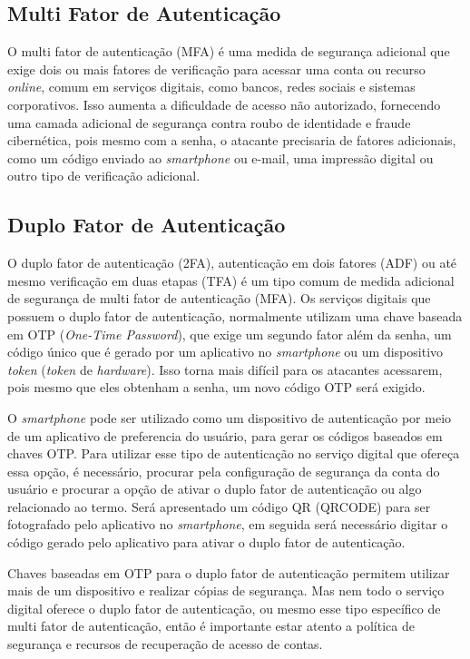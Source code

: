 \documentclass[12pt]{article}
\begin{document}
\subsection{Multi Fator de Autenticação}

O multi fator de autenticação (MFA) é uma medida de segurança adicional que
exige dois ou mais fatores de verificação para acessar uma conta ou
recurso \textit{online}, comum em serviços digitais, como bancos, redes sociais e
sistemas corporativos.
Isso aumenta a dificuldade de acesso não autorizado, fornecendo uma camada
adicional de segurança contra roubo de identidade e fraude cibernética, pois
mesmo com a senha, o atacante precisaria de fatores adicionais, como um código
enviado ao \textit{smartphone} ou e-mail, uma impressão digital ou outro tipo de
verificação adicional.

\subsection{Duplo Fator de Autenticação}

O duplo fator de autenticação (2FA), autenticação em dois fatores (ADF) ou
até mesmo verificação em duas etapas (TFA) é um tipo comum de medida adicional
de segurança de multi fator de autenticação (MFA).
Os serviços digitais que possuem o duplo fator de autenticação, normalmente
utilizam uma chave baseada em OTP (\textit{One-Time Password}), que exige um segundo fator
além da senha, um código único que é gerado por um aplicativo no \textit{smartphone} ou um
dispositivo \textit{token} (\textit{token} de \textit{hardware}).
Isso torna mais difícil para os atacantes acessarem, pois mesmo que eles
obtenham a senha, um novo código OTP será exigido.

O \textit{smartphone} pode ser utilizado como um dispositivo de autenticação por meio de um
aplicativo de preferencia do usuário, para gerar os códigos baseados em chaves OTP.
Para utilizar esse tipo de autenticação no serviço digital que ofereça essa opção,
é necessário, procurar pela configuração de segurança da conta do usuário e procurar
a opção de ativar o duplo fator de autenticação ou algo relacionado ao termo.
Será apresentado um código QR (QRCODE) para ser fotografado pelo aplicativo no \textit{smartphone},
em seguida será necessário digitar o código gerado pelo aplicativo para ativar o
duplo fator de autenticação.

Chaves baseadas em OTP para o duplo fator de autenticação permitem utilizar mais
de um dispositivo e realizar cópias de segurança.
Mas nem todo o serviço digital oferece o duplo fator de autenticação, ou
mesmo esse tipo específico de multi fator de autenticação, então é importante
estar atento a política de segurança e recursos de recuperação de acesso de contas.
\end{document}
